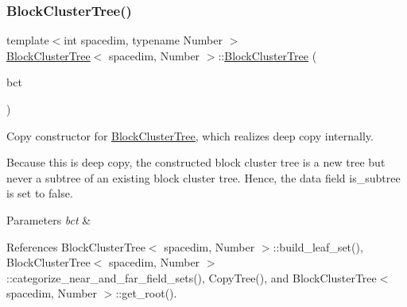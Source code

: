 \mbox{\label{classBlockClusterTree_a1c31aecfd91383f8b96601fd2b63dd62}} 
\subsubsection{\texorpdfstring{Block\+Cluster\+Tree()}{BlockClusterTree()}\hspace{0.1cm}{\footnotesize\ttfamily [7/8]}}
{\footnotesize\ttfamily template$<$int spacedim, typename Number $>$ \\
\hyperlink{classBlockClusterTree}{Block\+Cluster\+Tree}$<$ spacedim, Number $>$\+::\hyperlink{classBlockClusterTree}{Block\+Cluster\+Tree} (\begin{DoxyParamCaption}\item[{const \hyperlink{classBlockClusterTree}{Block\+Cluster\+Tree}$<$ spacedim, Number $>$ \&}]{bct }\end{DoxyParamCaption})}

Copy constructor for {\ttfamily \hyperlink{classBlockClusterTree}{Block\+Cluster\+Tree}}, which realizes deep copy internally.


\begin{DoxyDescription}
\item[Note ]Because this is deep copy, the constructed block cluster tree is a new tree but never a subtree of an existing block cluster tree. Hence, the data field {\ttfamily is\+\_\+subtree} is set to {\ttfamily false}. 
\end{DoxyDescription}


\begin{DoxyParams}{Parameters}
{\em bct} & \\
\hline
\end{DoxyParams}


References Block\+Cluster\+Tree$<$ spacedim, Number $>$\+::build\+\_\+leaf\+\_\+set(), Block\+Cluster\+Tree$<$ spacedim, Number $>$\+::categorize\+\_\+near\+\_\+and\+\_\+far\+\_\+field\+\_\+sets(), Copy\+Tree(), and Block\+Cluster\+Tree$<$ spacedim, Number $>$\+::get\+\_\+root().

\mbox{\label{classBlockClusterTree_ae3bb67cdcb7868237063c8003d4079ab}} 

